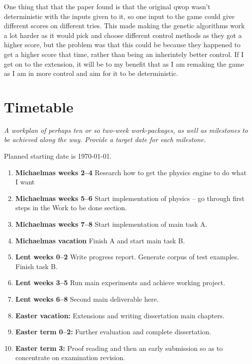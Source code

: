 \documentclass[12pt,a4paper,twoside]{article}
\begin{document}
One thing that that the paper found is that the original qwop wasn't deterministic with the inputs given to it, so one input to the game could give different scores on different tries. This made making the genetic algorithms work a lot harder as it would pick and choose different control methods as they got a higher score, but the problem was that this could be because they happened to get a higher score that time, rather than being an inherintely better control. If I get on to the extension, it will be to my benefit that as I am remaking the game as I am in more control and aim for it to be deterministic.



\section*{Timetable} \emph {A workplan of perhaps ten or so two-week work-packages, as well as milestones to be achieved along the way. Provide a target date for each milestone.}

Planned starting date is \today.



\begin{enumerate}

\item \textbf{Michaelmas weeks 2--4} Research how to get the physics engine to do what I want

\item \textbf{Michaelmas weeks 5--6} Start implementation of physics -- go through first steps in the Work to be done section.

\item \textbf{Michaelmas weeks 7--8} Start implementation of main task A.

\item \textbf{Michaelmas vacation} Finish A and start main task B.

\item \textbf{Lent weeks 0--2} Write progress report. Generate corpus of
  test examples. Finish task B.

\item \textbf{Lent weeks 3--5} Run main experiments and achieve working project.

\item \textbf{Lent weeks 6--8} Second main deliverable here. 
\item \textbf{Easter vacation:} Extensions and writing dissertation main
  chapters.

\item \textbf{Easter term 0--2:}  Further evaluation and complete dissertation.

\item \textbf{Easter term 3:} Proof reading and then an early submission
  so as to concentrate on examination revision.

\end{enumerate}
\end{document}
